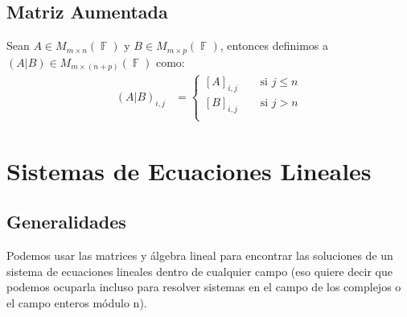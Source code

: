 \documentclass[12pt, fleqn]{report}                             %
\DeclareMathOperator \Space {\quad}                             %
\theoremstyle{break}                                            %
\DeclareMathOperator \GenericField {\mathbb{F}}                 %
\begin{document}
        \clearpage
        \section{Matriz Aumentada}

            Sean $A \in M_{m \times n}(\GenericField)$ y 
            $B \in M_{m \times p}(\GenericField)$, entonces
            definimos a $(A | B) \in M_{m \times (n + p)}(\GenericField)$
            como:
            \begin{align*}
                (A | B)_{i, j}
                    &= 
                    \begin{cases}
                        [A]_{i, j} \Space \text{ si } j \leq n        \\
                        [B]_{i, j} \Space \text{ si } j > n           \\
                    \end{cases}
            \end{align*}




    \chapter{Sistemas de Ecuaciones Lineales}
        \clearpage


        \section{Generalidades}

            Podemos usar las matrices y álgebra lineal para encontrar las soluciones
            de un sistema de ecuaciones lineales dentro de cualquier campo (eso quiere
            decir que podemos ocuparla incluso para resolver sistemas en el campo de
            los complejos o el campo enteros módulo n).

\end{document}
